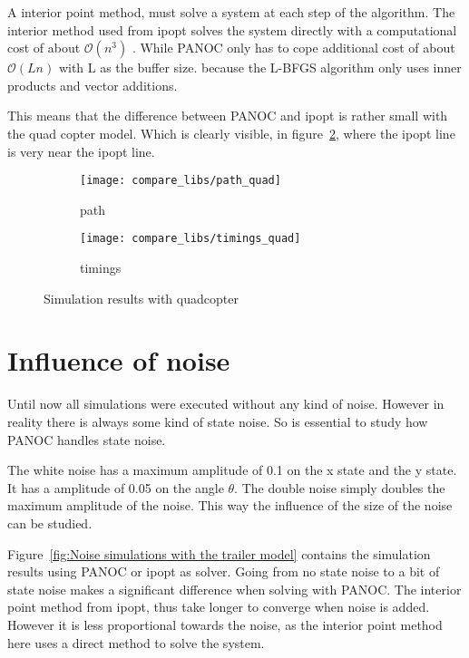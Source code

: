 A interior point method, must solve a system at each step of the algorithm. The interior method used from ipopt solves the system directly with a computational cost of about $\mathcal{O}(n^3)$ . While PANOC only has to cope additional cost of about $\mathcal{O}(Ln)$ with L as the buffer size.  because the L-BFGS algorithm only uses inner products and vector additions.

This means that the difference between PANOC and ipopt is rather small with the quad copter model. Which is clearly visible, in figure~\ref{fig:timings trailer quad}, where the ipopt line is very near the ipopt line.
\begin{figure}[H]
	\centering
	\begin{subfigure}[b]{0.45\textwidth}
		\centering
		\texttt{[image: compare\_libs/path\_quad]}
		\caption{path}
		\label{fig:solution path trailer quad}
	\end{subfigure}
	\hfill
	\begin{subfigure}[b]{0.45\textwidth}
		\centering
		\texttt{[image: compare\_libs/timings\_quad]}
		\caption{timings}
		\label{fig:timings trailer quad}
	\end{subfigure}
	\caption{Simulation results with quadcopter}
	\label{fig:Simulation results with quadcopter}
\end{figure}

\section{Influence of noise}
Until now all simulations were executed without any kind of noise. However in reality there is always some kind of state noise. So is essential to study how PANOC handles state noise.

The white noise has a maximum amplitude of 0.1 on the x state and the y state. It has a amplitude of 0.05 on the angle $\theta$. The double noise simply doubles the maximum amplitude of the noise. This way the influence of the size of the noise can be studied.

Figure~\ref{fig:Noise simulations with the trailer model} contains the simulation results using PANOC or ipopt as solver. Going from no state noise to a bit of state noise makes a significant difference when solving with PANOC. The interior point method from ipopt, thus take longer to converge when noise is added. However it is less proportional towards the noise, as the interior point method here uses a direct method to solve the system.

